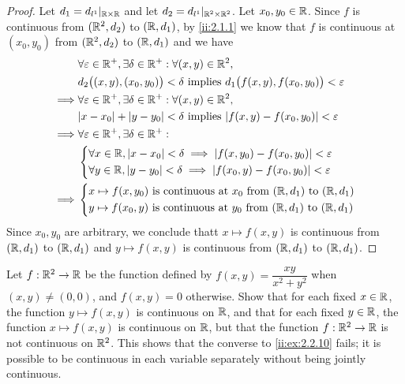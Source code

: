 \begin{proof}
  Let \(d_1 = d_{l^1}|_{\mathbb{R} \times \mathbb{R}}\) and let \(d_2 = d_{l^1}|_{\mathbb{R}^2 \times \mathbb{R}^2}\).
  Let \(x_0, y_0 \in \mathbb{R}\).
  Since \(f\) is continuous from \((\mathbb{R}^2, d_2)\) to \((\mathbb{R}, d_1)\), by \cref{ii:2.1.1} we know that \(f\) is continuous at \((x_0, y_0)\) from \((\mathbb{R}^2, d_2)\) to \((\mathbb{R}, d_1)\) and we have
  \begin{align*}
             & \forall \varepsilon \in \R^+, \exists \delta \in \R^+ : \forall (x, y) \in \R^2,                          \\
             & d_2\big((x, y), (x_0, y_0)\big) < \delta \text{ implies } d_1\big(f(x, y), f(x_0, y_0)\big) < \varepsilon \\
    \implies & \forall \varepsilon \in \R^+, \exists \delta \in \R^+ : \forall (x, y) \in \R^2,                          \\
             & \abs{x - x_0} + \abs{y - y_0} < \delta \text{ implies } \abs{f(x, y) - f(x_0, y_0)} < \varepsilon         \\
    \implies & \forall \varepsilon \in \R^+, \exists \delta \in \R^+ :                                                   \\
             & \begin{dcases}
                 \forall x \in \R, \abs{x - x_0} < \delta \implies \abs{f(x, y_0) - f(x_0, y_0)} < \varepsilon \\
                 \forall y \in \R, \abs{y - y_0} < \delta \implies \abs{f(x_0, y) - f(x_0, y_0)} < \varepsilon
               \end{dcases}             \\
    \implies & \begin{dcases}
                 x \mapsto f(x, y_0) \text{ is continuous at } x_0 \text{ from } (\R, d_1) \text{ to } (\R, d_1) \\
                 y \mapsto f(x_0, y) \text{ is continuous at } y_0 \text{ from } (\R, d_1) \text{ to } (\R, d_1)
               \end{dcases}
  \end{align*}
  Since \(x_0, y_0\) are arbitrary, we conclude thatt \(x \mapsto f(x, y)\) is continuous from \((\mathbb{R}, d_1)\) to \((\mathbb{R}, d_1)\) and \(y \mapsto f(x, y)\) is continuous from \((\mathbb{R}, d_1)\) to \((\mathbb{R}, d_1)\).
\end{proof}

\begin{ex}\label{ii:ex:2.2.11}
  Let \(f : \mathbb{R}^2 \to \mathbb{R}\) be the function defined by \(f(x, y) = \dfrac{xy}{x^2 + y^2}\) when \((x, y) \neq (0, 0)\), and \(f(x, y) = 0\) otherwise.
  Show that for each fixed \(x \in \mathbb{R}\), the function \(y \mapsto f(x, y)\) is continuous on \(\mathbb{R}\), and that for each fixed \(y \in \mathbb{R}\), the function \(x \mapsto f(x, y)\) is continuous on \(\mathbb{R}\), but that the function \(f : \mathbb{R}^2 \to \mathbb{R}\) is not continuous on \(\mathbb{R}^2\).
  This shows that the converse to \cref{ii:ex:2.2.10} fails;
  it is possible to be continuous in each variable separately without being jointly continuous.
\end{ex}

